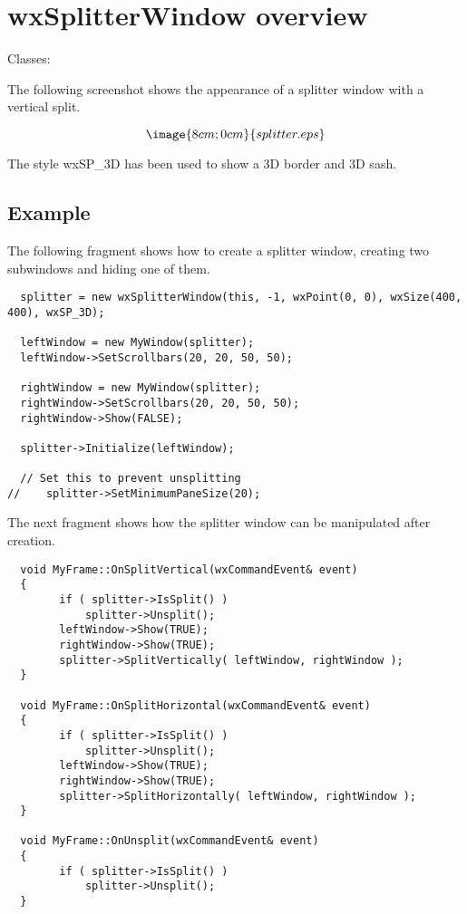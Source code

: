 \section{wxSplitterWindow overview}\label{wxsplitterwindowoverview}

Classes: 

The following screenshot shows the appearance of a splitter window with a vertical split.

$$\image{8cm;0cm}{splitter.eps}$$

The style wxSP\_3D has been used to show a 3D border and 3D sash.

\subsection{Example}

The following fragment shows how to create a splitter window, creating two
subwindows and hiding one of them.

{\small
\begin{verbatim}
  splitter = new wxSplitterWindow(this, -1, wxPoint(0, 0), wxSize(400, 400), wxSP_3D);

  leftWindow = new MyWindow(splitter);
  leftWindow->SetScrollbars(20, 20, 50, 50);

  rightWindow = new MyWindow(splitter);
  rightWindow->SetScrollbars(20, 20, 50, 50);
  rightWindow->Show(FALSE);

  splitter->Initialize(leftWindow);

  // Set this to prevent unsplitting
//    splitter->SetMinimumPaneSize(20);
\end{verbatim}
}

The next fragment shows how the splitter window can be manipulated after creation.

{\small
\begin{verbatim}
  void MyFrame::OnSplitVertical(wxCommandEvent& event)
  {
        if ( splitter->IsSplit() )
            splitter->Unsplit();
        leftWindow->Show(TRUE);
        rightWindow->Show(TRUE);
        splitter->SplitVertically( leftWindow, rightWindow );
  }

  void MyFrame::OnSplitHorizontal(wxCommandEvent& event)
  {
        if ( splitter->IsSplit() )
            splitter->Unsplit();
        leftWindow->Show(TRUE);
        rightWindow->Show(TRUE);
        splitter->SplitHorizontally( leftWindow, rightWindow );
  }

  void MyFrame::OnUnsplit(wxCommandEvent& event)
  {
        if ( splitter->IsSplit() )
            splitter->Unsplit();
  }
\end{verbatim}
}

